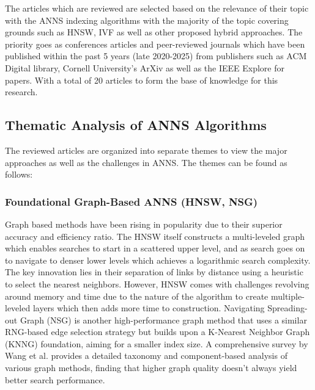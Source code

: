 \documentclass[conference]{IEEEtran}
\begin{document}
The articles which are reviewed are selected based on the relevance of their topic with the ANNS indexing algorithms with the majority of the topic covering grounds such as HNSW, IVF as well as other proposed hybrid approaches. The priority goes as conferences articles and peer-reviewed journals which have been published within the past 5 years (late 2020-2025) from publishers such as ACM Digital library, Cornell University's ArXiv as well as the IEEE Explore for papers. With a total of 20 articles to form the base of knowledge for this research.

\subsection{Thematic Analysis of ANNS Algorithms}
The reviewed articles are organized into separate themes to view the major approaches as well as the challenges in ANNS. The themes can be found as follows:

\subsubsection{Foundational Graph-Based ANNS (HNSW, NSG)}
Graph based methods have been rising in popularity due to their superior accuracy and efficiency ratio. The HNSW itself constructs a multi-leveled graph which enables searches to start in a scattered upper level, and as search goes on to navigate to denser lower levels which achieves a logarithmic search complexity. The key innovation lies in their separation of links by distance using a heuristic to select the nearest neighbors. However, HNSW comes with challenges revolving around memory and time due to the nature of the algorithm to create multiple-leveled layers which then adds more time to construction. Navigating Spreading-out Graph (NSG) is another high-performance graph method that uses a similar RNG-based edge selection strategy but builds upon a K-Nearest Neighbor Graph (KNNG) foundation, aiming for a smaller index size. A comprehensive survey by Wang et al. provides a detailed taxonomy and component-based analysis of various graph methods, finding that higher graph quality doesn't always yield better search performance.
\end{document}
